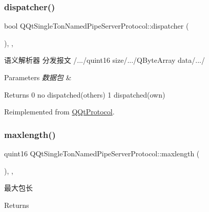 \subsubsection{\texorpdfstring{dispatcher()}{dispatcher()}}
{\footnotesize\ttfamily bool Q\+Qt\+Single\+Ton\+Named\+Pipe\+Server\+Protocol\+::dispatcher (\begin{DoxyParamCaption}\item[{const Q\+Byte\+Array \&}]{ }\end{DoxyParamCaption})\hspace{0.3cm}{\ttfamily [override]}, {\ttfamily [protected]}, {\ttfamily [virtual]}}



语义解析器 分发报文 /.../quint16 size/.../\+Q\+Byte\+Array data/.../ 


\begin{DoxyParams}{Parameters}
{\em 数据包} & \\
\hline
\end{DoxyParams}
\begin{DoxyReturn}{Returns}
0 no dispatched(others) 1 dispatched(own) 
\end{DoxyReturn}


Reimplemented from \mbox{\hyperlink{class_q_qt_protocol_a35a69c4b89c8cf7459038f40d75e0dc9}{Q\+Qt\+Protocol}}.

\mbox{\label{class_q_qt_single_ton_named_pipe_server_protocol_a27bbc0907d5f063c2505c047e2e92b47}} 
\subsubsection{\texorpdfstring{maxlength()}{maxlength()}}
{\footnotesize\ttfamily quint16 Q\+Qt\+Single\+Ton\+Named\+Pipe\+Server\+Protocol\+::maxlength (\begin{DoxyParamCaption}{ }\end{DoxyParamCaption})\hspace{0.3cm}{\ttfamily [override]}, {\ttfamily [protected]}, {\ttfamily [virtual]}}



最大包长 

\begin{DoxyReturn}{Returns}

\end{DoxyReturn}


